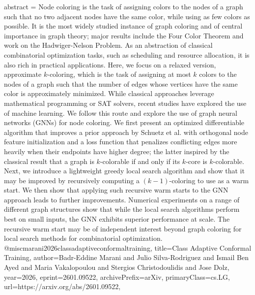 {      abstract = {Node coloring is the task of assigning colors to the nodes of a graph such that no two adjacent nodes have the same color, while using as few colors as possible. It is the most widely studied instance of graph coloring and of central importance in graph theory; major results include the Four Color Theorem and work on the Hadwiger-Nelson Problem. As an abstraction of classical combinatorial optimization tasks, such as scheduling and resource allocation, it is also rich in practical applications. Here, we focus on a relaxed version, approximate $k$-coloring, which is the task of assigning at most $k$ colors to the nodes of a graph such that the number of edges whose vertices have the same color is approximately minimized. While classical approaches leverage mathematical programming or SAT solvers, recent studies have explored the use of machine learning. We follow this route and explore the use of graph neural networks (GNNs) for node coloring. We first present an optimized differentiable algorithm that improves a prior approach by Schuetz et al. with orthogonal node feature initialization and a loss function that penalizes conflicting edges more heavily when their endpoints have higher degree; the latter inspired by the classical result that a graph is $k$-colorable if and only if its $k$-core is $k$-colorable. Next, we introduce a lightweight greedy local search algorithm and show that it may be improved by recursively computing a $(k-1)$-coloring to use as a warm start. We then show that applying such recursive warm starts to the GNN approach leads to further improvements. Numerical experiments on a range of different graph structures show that while the local search algorithms perform best on small inputs, the GNN exhibits superior performance at scale. The recursive warm start may be of independent interest beyond graph coloring for local search methods for combinatorial optimization.}
}@misc{marani2026classadaptiveconformaltraining,
      title={Class Adaptive Conformal Training}, 
      author={Badr-Eddine Marani and Julio Silva-Rodriguez and Ismail Ben Ayed and Maria Vakalopoulou and Stergios Christodoulidis and Jose Dolz},
      year={2026},
      eprint={2601.09522},
      archivePrefix={arXiv},
      primaryClass={cs.LG},
      url={https://arxiv.org/abs/2601.09522},
}
